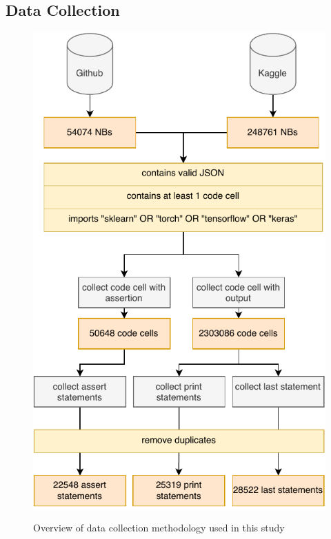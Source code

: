 \subsection{Data Collection}\label{sec:data-collect}



\begin{figure}
  \centering
  \includegraphics[width=0.75\linewidth]{data-collection.pdf}
  \label{fig:data-collection}
  \caption{Overview of data collection methodology used in this study}
\end{figure}

